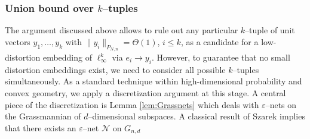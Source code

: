 \documentclass[11pt]{amsart}
\theoremstyle{definition}
\theoremstyle{plain}
\def\Net{{\mathcal N}}
\begin{document}
\subsubsection{Union bound over $k$--tuples}
The argument discussed above allows to rule out
any particular $k$--tuple of unit vectors $y_1,\dots,y_k$ 
with $\|y_i\|_{P_{N,n}}=\Theta(1)$, $i\leq k$,
as a candidate for a low-distortion embedding of $\ell_\infty^k$
via $e_i\to y_i$.
However, to guarantee that no small distortion embeddings exist,
we need to consider all possible $k$--tuples simultaneously.
As a standard technique within high-dimensional probability
and convex geometry, we apply a discretization argument
at this stage. A central piece of the discretization
is Lemma \ref{lem:Grassnets} which deals with $\varepsilon$--nets
on the Grassmannian of $d$--dimensional subspaces.
A classical result of Szarek \cite{Szarek81}
implies that there exists an $\varepsilon$--net $\Net$ on $G_{n,d}$
\end{document}
